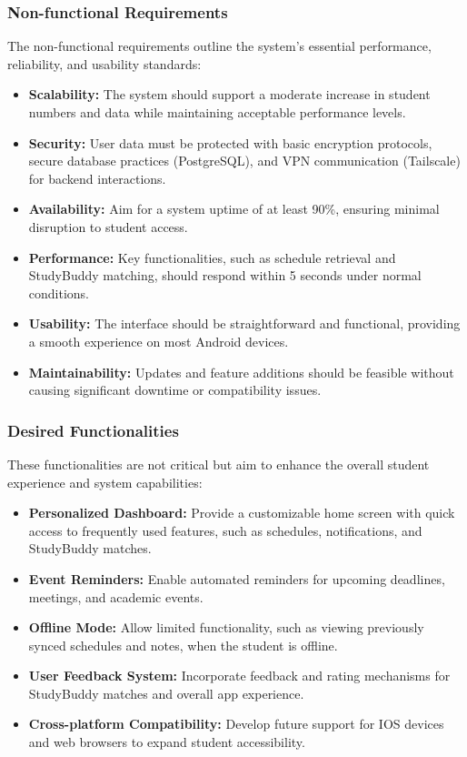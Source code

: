 \documentclass[12pt]{article}
\begin{document}
\subsubsection{Non-functional Requirements}
The non-functional requirements outline the system's essential performance, reliability, and usability standards:  
\begin{itemize}  
    \item \textbf{Scalability:} The system should support a moderate increase in student numbers and data while maintaining acceptable performance levels.  
    \item \textbf{Security:} User data must be protected with basic encryption protocols, secure database practices (PostgreSQL), and VPN communication (Tailscale) for backend interactions.  
    \item \textbf{Availability:} Aim for a system uptime of at least 90\%, ensuring minimal disruption to student access.  
    \item \textbf{Performance:} Key functionalities, such as schedule retrieval and StudyBuddy matching, should respond within 5 seconds under normal conditions.  
    \item \textbf{Usability:} The interface should be straightforward and functional, providing a smooth experience on most Android devices.  
    \item \textbf{Maintainability:} Updates and feature additions should be feasible without causing significant downtime or compatibility issues.  
\end{itemize}  

\subsubsection{Desired Functionalities}
These functionalities are not critical but aim to enhance the overall student experience and system capabilities:  
\begin{itemize}  
    \item \textbf{Personalized Dashboard:} Provide a customizable home screen with quick access to frequently used features, such as schedules, notifications, and StudyBuddy matches.  
    \item \textbf{Event Reminders:} Enable automated reminders for upcoming deadlines, meetings, and academic events.  
    \item \textbf{Offline Mode:} Allow limited functionality, such as viewing previously synced schedules and notes, when the student is offline.  
    \item \textbf{User Feedback System:} Incorporate feedback and rating mechanisms for StudyBuddy matches and overall app experience.  
    \item \textbf{Cross-platform Compatibility:} Develop future support for IOS devices and web browsers to expand student accessibility.  
\end{itemize}  
\end{document}
